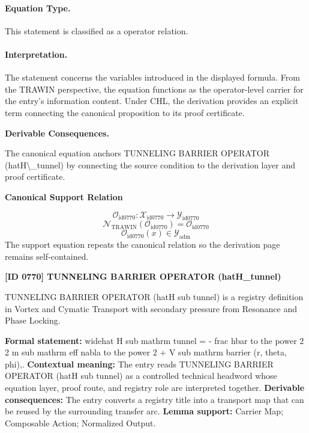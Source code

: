 \paragraph{Equation Type.}
This statement is classified as a operator relation.

\paragraph{Interpretation.}
The statement concerns the variables introduced in the displayed formula. From the TRAWIN perspective, the equation functions as the operator-level carrier for the entry’s information content. Under CHL, the derivation provides an explicit term connecting the canonical proposition to its proof certificate.

\par\vspace{0.35em}
\noindent\textbf{Derivable Consequences.}\quad
\begingroup
\footnotesize
\raggedright
The canonical equation anchors TUNNELING BARRIER OPERATOR (hatH\textbackslash{}\_tunnel) by connecting the source condition to the derivation layer and proof certificate.
\par\endgroup

\noindent\textbf{Canonical Support Relation}\par
\[
\mathcal{O}_{\mathrm{id0770}}:\mathcal{X}_{\mathrm{id0770}}\longrightarrow\mathcal{Y}_{\mathrm{id0770}}
\]
\[
\mathcal{N}_{\mathrm{TRAWIN}}(\mathcal{O}_{\mathrm{id0770}})=\mathcal{O}_{\mathrm{id0770}}
\]
\[
\mathcal{O}_{\mathrm{id0770}}(x)\in\mathcal{Y}_{\mathrm{adm}}
\]
\noindent The support equation repeats the canonical relation so the derivation page remains self-contained.\par

\clearpage
\noindent\textbf{[ID 0770] TUNNELING BARRIER OPERATOR (hatH\_tunnel)}\par
\vspace{0.35em}
\begingroup\small
{}
TUNNELING BARRIER OPERATOR (hatH sub tunnel) is a registry definition in Vortex and Cymatic Transport with secondary pressure from Resonance and Phase Locking.

\begingroup\footnotesize\setlength{\emergencystretch}{3em}\sloppy
\textbf{Formal statement:} widehat H sub mathrm tunnel = - frac hbar to the power 2 2 m sub mathrm eff nabla to the power 2 + V sub mathrm barrier (r, theta, phi),. \textbf{Contextual meaning:} The entry reads TUNNELING BARRIER OPERATOR (hatH sub tunnel) as a controlled technical headword whose equation layer, proof route, and registry role are interpreted together. \textbf{Derivable consequences:} The entry converts a registry title into a transport map that can be reused by the surrounding transfer arc. \textbf{Lemma support:} Carrier Map; Composable Action; Normalized Output.\par
\endgroup

